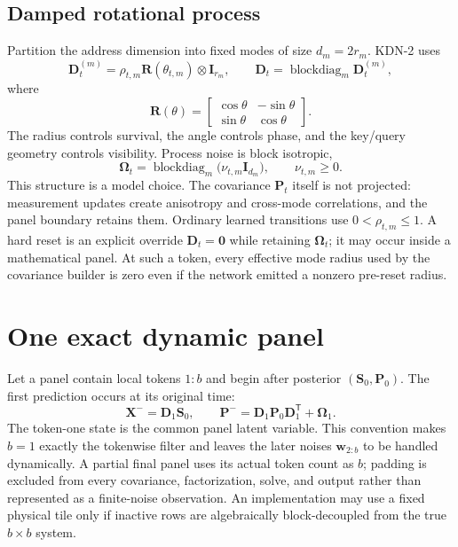 \documentclass[11pt]{article}
\newcommand{\ve}[1]{\boldsymbol{#1}}
\newcommand{\tr}{\mathsf{T}}
\DeclareMathOperator{\blockdiag}{blockdiag}
\begin{document}
\subsection{Damped rotational process}

Partition the address dimension into fixed modes of size $d_m=2r_m$.  KDN-2 uses
\begin{equation}
  \ve{D}_t^{(m)}
  =\rho_{t,m}\ve{R}(\theta_{t,m})\otimes\ve{I}_{r_m},
  \qquad
  \ve{D}_t=\blockdiag_m\ve{D}_t^{(m)},
  \label{eq:direction-a-transition}
\end{equation}
where
\begin{equation}
  \ve{R}(\theta)
  =
  \begin{bmatrix}
    \cos\theta&-\sin\theta\\
    \sin\theta& \cos\theta
  \end{bmatrix}.
\end{equation}
The radius controls survival, the angle controls phase, and the key/query geometry controls
visibility.  Process noise is block isotropic,
\begin{equation}
  \ve{\Omega}_t
  =\blockdiag_m\bigl(\nu_{t,m}\ve{I}_{d_m}\bigr),
  \qquad \nu_{t,m}\geq0.
  \label{eq:block-noise}
\end{equation}
This structure is a model choice.  The covariance $\ve{P}_t$ itself is not projected: measurement
updates create anisotropy and cross-mode correlations, and the panel boundary retains them.
Ordinary learned transitions use $0<\rho_{t,m}\leq1$.  A hard reset is an explicit override
$\ve{D}_t=\ve{0}$ while retaining $\ve{\Omega}_t$; it may occur inside a mathematical panel.
At such a token, every effective mode radius used by the covariance builder is zero even if the
network emitted a nonzero pre-reset radius.

\section{One exact dynamic panel}

Let a panel contain local tokens $1{:}b$ and begin after posterior
$(\ve{S}_0,\ve{P}_0)$.  The first prediction occurs at its original time:
\begin{equation}
  \ve{X}^-=\ve{D}_1\ve{S}_0,
  \qquad
  \ve{P}^-=\ve{D}_1\ve{P}_0\ve{D}_1^{\tr}+\ve{\Omega}_1.
  \label{eq:first-prediction}
\end{equation}
The token-one state is the common panel latent variable.  This convention makes $b=1$ exactly
the tokenwise filter and leaves the later noises $\ve{w}_{2:b}$ to be handled dynamically.
A partial final panel uses its actual token count as $b$; padding is excluded from every covariance,
factorization, solve, and output rather than represented as a finite-noise observation.
An implementation may use a fixed physical tile only if inactive rows are algebraically
block-decoupled from the true $b\times b$ system.
\end{document}
